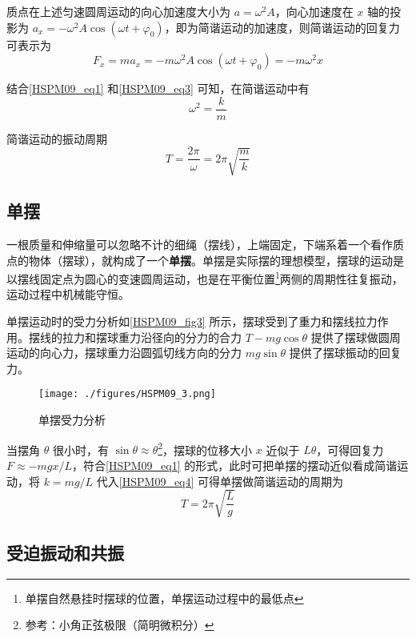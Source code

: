 质点在上述匀速圆周运动的向心加速度大小为 $a=\omega^2 A$，向心加速度在 $x$ 轴的投影为 $a_x=-\omega^2 A\cos(\omega t + \varphi_0)$，即为简谐运动的加速度，则简谐运动的回复力可表示为
\begin{equation}\label{HSPM09_eq3}
F_x=ma_x=-m\omega^2 A\cos(\omega t + \varphi_0)= -m\omega^2 x
\end{equation}

结合\autoref{HSPM09_eq1} 和\autoref{HSPM09_eq3} 可知，在简谐运动中有
\begin{equation}
\omega^2=\frac km
\end{equation}

简谐运动的振动周期
\begin{equation}\label{HSPM09_eq4}
T=\frac {2\pi}{\omega}=2\pi\sqrt{\frac mk}
\end{equation}


\subsection{单摆}

一根质量和伸缩量可以忽略不计的细绳（摆线），上端固定，下端系着一个看作质点的物体（摆球），就构成了一个\textbf{单摆}。单摆是实际摆的理想模型，摆球的运动是以摆线固定点为圆心的变速圆周运动，也是在平衡位置\footnote{单摆自然悬挂时摆球的位置，单摆运动过程中的最低点}两侧的周期性往复振动，运动过程中机械能守恒。

单摆运动时的受力分析如\autoref{HSPM09_fig3} 所示，摆球受到了重力和摆线拉力作用。摆线的拉力和摆球重力沿径向的分力的合力 $T-mg\cos\theta$ 提供了摆球做圆周运动的向心力，摆球重力沿圆弧切线方向的分力 $mg\sin\theta$ 提供了摆球振动的回复力。

\begin{figure}[ht]
\centering
\texttt{[image: ./figures/HSPM09\_3.png]}
\caption{单摆受力分析} \label{HSPM09_fig3}
\end{figure}

当摆角 $\theta$ 很小时，有 $\sin\theta \approx \theta$\footnote{参考：小角正弦极限（简明微积分）}，摆球的位移大小 $x$ 近似于 $L\theta$，可得回复力 $F \approx -mgx/L$，符合\autoref{HSPM09_eq1} 的形式，此时可把单摆的摆动近似看成简谐运动，将 $k=mg/L$ 代入\autoref{HSPM09_eq4} 可得单摆做简谐运动的周期为
\begin{equation}
T=2\pi\sqrt{\frac Lg}
\end{equation}

\subsection{受迫振动和共振}

